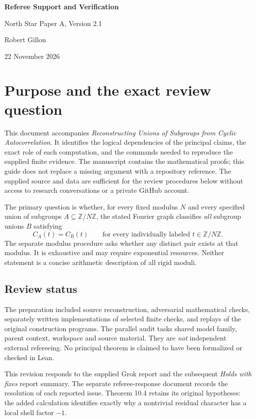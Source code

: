 \documentclass[10pt]{article}
\newcommand{\Z}{\mathbb Z}
\begin{document}
\begin{center}
{\LARGE\bfseries Referee Support and Verification\par}
\vspace{.45em}
{\large North Star Paper A, Version 2.1\par}
{\large Robert Gillon\par}
\vspace{.3em}
22 November 2026
\end{center}

\section{Purpose and the exact review question}

This document accompanies \textit{Reconstructing Unions of Subgroups from
Cyclic Autocorrelation}. It identifies the logical dependencies of the
principal claims, the exact role of each computation, and the commands
needed to reproduce the supplied finite evidence. The manuscript contains
the mathematical proofs; this guide does not replace a missing argument
with a repository reference. The supplied source and data are sufficient
for the review procedures below without access to research conversations
or a private GitHub account.

The primary question is whether, for every fixed modulus $N$ and every
specified union of subgroups $A\subseteq\Z/N\Z$, the stated Fourier graph
classifies \emph{all} subgroup unions $B$ satisfying
\[
 C_A(t)=C_B(t)\qquad\text{for every individually labeled }t\in\Z/N\Z.
\]
The separate modulus procedure asks whether any distinct pair exists at
that modulus. It is exhaustive and may require exponential resources.
Neither statement is a concise arithmetic description of all rigid moduli.

\subsection*{Review status}
The preparation included source reconstruction, adversarial mathematical
checks, separately written implementations of selected finite checks, and
replays of the original construction programs. The parallel audit tasks
shared model family, parent context, workspace and source material. They
are \emph{not} independent external refereeing. No principal theorem is
claimed to have been formalized or checked in Lean.

This revision responds to the supplied Grok report and the subsequent
\textit{Holds with fixes} report summary. The separate referee-response
document records the resolution of each reported issue. Theorem 10.4
retains its original hypotheses: the added calculation identifies exactly
why a nontrivial residual character has a local shell factor $-1$.
\end{document}
